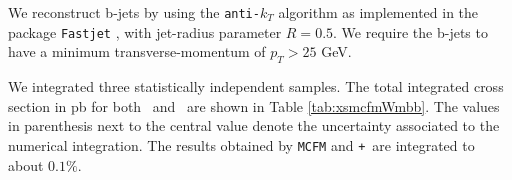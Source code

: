 We reconstruct b-jets by using the \texttt{anti-$k_T$} algorithm
\cite{antikT} as implemented in the package \texttt{Fastjet}
\cite{Cacciari:2005hq,Cacciari:2011ma}, with jet-radius parameter $R=0.5$. We require
the b-jets to have a minimum transverse-momentum of $p_T>25$ GeV.

We integrated three statistically independent samples. The
total integrated cross section in pb for both \Wbbm~and \Wbbp~are shown in Table
\ref{tab:xsmcfmWmbb}. The values in parenthesis next to the central value denote the uncertainty
associated to the numerical integration. The results obtained by
\texttt{MCFM} and \BlackHat\texttt{+}\SHERPA{}~are integrated to about $0.1\%$. 


